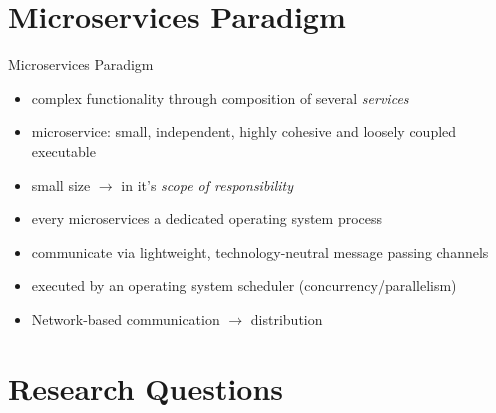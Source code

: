 \documentclass{beamer}
\begin{document}


\section{Microservices Paradigm}


\begin{frame}{Microservices Paradigm}

\pause

\begin{itemize}
  \item complex functionality through composition of several \textit{services}
  \item microservice: small, independent, highly cohesive and loosely coupled executable
  \item \glqq small\grqq{} size $\rightarrow$ in it's \textit{scope of responsibility}
  \item every microservices a dedicated operating system process
  \item communicate via lightweight, technology-neutral message passing channels
  \item executed by an operating system scheduler (concurrency/parallelism)
  \item Network-based communication $\rightarrow$ distribution
\end{itemize}

\end{frame}


\section{Research Questions}

\end{document}
